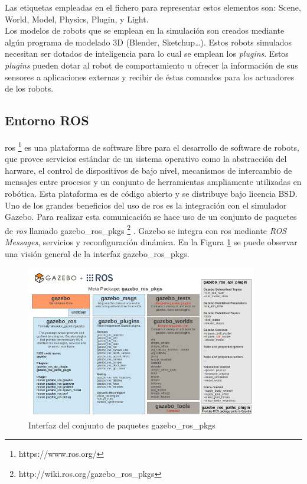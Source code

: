 Las etiquetas empleadas en el fichero para representar estos elementos son: Scene, World, Model, Physics, Plugin, y Light.\\

Los modelos de robots que se emplean en la simulación son creados mediante algún programa de modelado 3D (Blender, Sketchup…). Estos robots simulados necesitan ser dotados de inteligencia para lo cual se emplean los \textit{plugins}. Estos \textit{plugins} pueden dotar al robot de comportamiento u ofrecer la información de sus sensores a aplicaciones externas y recibir de éstas comandos para los actuadores de los robots.

\subsection{Entorno ROS}

\acrfull{ros} \footnote{https://www.ros.org/} \cite{middleware1} es una plataforma de software libre para el desarrollo de software de robots, que provee servicios estándar de un sistema operativo como la abstracción del harware, el control de dispositivos de bajo nivel, mecanismos de intercambio de mensajes entre procesos y un conjunto de herramientas ampliamente utilizadas en robótica. Esta plataforma es de código abierto y se distribuye bajo licencia BSD.\\

Uno de los grandes beneficios del uso de \acrshort{ros} es la integración con el simulador Gazebo. Para realizar esta comunicación se hace uso de un conjunto de paquetes de \textit{ros} llamado gazebo\_ros\_pkgs \footnote{http://wiki.ros.org/gazebo\_ros\_pkgs} \cite{ros_integration}. Gazebo se integra con \acrshort{ros} mediante \textit{ROS Messages}, servicios y reconfiguración dinámica. En la Figura \ref{fig.ros} se puede observar una visión general de la interfaz gazebo\_ros\_pkgs.\\


\begin{figure}[H]
  \begin{center}
    \includegraphics[width=0.9\textwidth]{figures/Estado_arte/ros.png}
		\caption{Interfaz del conjunto de paquetes gazebo\_ros\_pkgs}
		\label{fig.ros}
		\end{center}
\end{figure}


